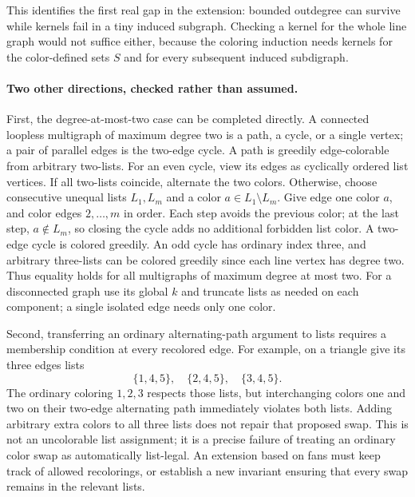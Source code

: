 \documentclass[11pt]{article}
\begin{document}
This identifies the first real gap in the extension: bounded outdegree
can survive while kernels fail in a tiny induced subgraph. Checking a
kernel for the whole line graph would not suffice either, because the
coloring induction needs kernels for the color-defined sets $S$ and for
every subsequent induced subdigraph.

\paragraph{Two other directions, checked rather than assumed.}
First, the degree-at-most-two case can be completed directly. A connected
loopless multigraph of maximum degree two is a path, a cycle, or a single
vertex; a pair of parallel edges is the two-edge cycle. A path is greedily
edge-colorable from arbitrary two-lists. For an even cycle, view its edges
as cyclically ordered list vertices. If all two-lists coincide, alternate
the two colors. Otherwise, choose consecutive unequal lists $L_1,L_m$
and a color $a\in L_1\setminus L_m$. Give edge one color $a$, and color
edges $2,\ldots,m$ in order. Each step avoids the previous color; at the
last step, $a\notin L_m$, so closing the cycle adds no additional
forbidden list color. A two-edge cycle is colored greedily. An odd
cycle has ordinary index three, and arbitrary three-lists can be colored
greedily since each line vertex has degree two. Thus equality holds
for all multigraphs of maximum degree at most two. For a disconnected
graph use its global $k$ and truncate lists as needed on each component;
a single isolated edge needs only one color.

Second, transferring an ordinary alternating-path argument to lists
requires a membership condition at every recolored edge. For example,
on a triangle give its three edges lists
\[
 \{1,4,5\},\quad\{2,4,5\},\quad\{3,4,5\}.
\]
The ordinary coloring $1,2,3$ respects those lists, but interchanging
colors one and two on their two-edge alternating path immediately
violates both lists. Adding arbitrary extra colors to all three lists
does not repair that proposed swap. This is not an uncolorable list
assignment; it is a precise failure of treating an ordinary color swap
as automatically list-legal. An extension based on fans must keep track
of allowed recolorings, or establish a new invariant ensuring that
every swap remains in the relevant lists.
\end{document}
